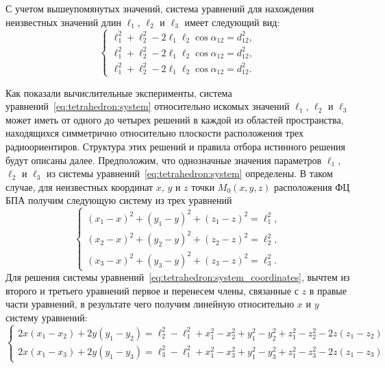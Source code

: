 \documentclass[../main.tex]{subfiles}
\begin{document}
С учетом вышеупомянутых значений, система уравнений для нахождения неизвестных значений длин $\ell_1$, $\ell_2$ и $\ell_3$ имеет следующий вид:
\begin{equation} \label{eq:tetrahedron:system}
    \begin{cases}
    \ell_1^2 + \ell_2^2 - 2 \ell_1 \ell_2 \cos\alpha_{12} = d_{12}^2, \\
    \ell_1^2 + \ell_2^2 - 2 \ell_1 \ell_2 \cos\alpha_{12} = d_{12}^2, \\
    \ell_1^2 + \ell_2^2 - 2 \ell_1 \ell_2 \cos\alpha_{12} = d_{12}^2.
    \end{cases}
\end{equation}

Как показали вычислительные эксперименты, система уравнений~\eqref{eq:tetrahedron:system} относительно искомых значений $\ell_1$, $\ell_2$ и $\ell_3$ может иметь от одного до четырех решений в каждой из областей пространства, находящихся симметрично относительно плоскости расположения трех радиоориентиров. Структура этих решений и правила отбора истинного решения будут описаны далее. Предположим, что однозначные значения параметров $\ell_1$, $\ell_2$ и $\ell_3$ из системы уравнений~\eqref{eq:tetrahedron:system} определены. В таком случае, для неизвестных координат $x$, $y$ и $z$ точки $M_0\left(x, y, z\right)$ расположения ФЦ БПА получим следующую систему из трех уравнений
\begin{equation}\label{eq:tetrahedron:system_coordinates}
    \begin{cases}
        \left(x_1 - x\right)^2 + \left(y_1 - y\right)^2 + \left(z_1 - z\right)^2 = \ell_1^2, \\
        \left(x_2 - x\right)^2 + \left(y_2 - y\right)^2 + \left(z_2 - z\right)^2 = \ell_2^2, \\
        \left(x_3 - x\right)^2 + \left(y_3 - y\right)^2 + \left(z_3 - z\right)^2 = \ell_3^2.
    \end{cases}
\end{equation}
Для решения системы уравнений~\eqref{eq:tetrahedron:system_coordinates}, вычтем из второго и третьего уравнений первое и перенесем члены, связанные с $z$ в правые части уравнений, в результате чего получим линейную относительно $x$ и $y$ систему уравнений:
\begin{equation} \label{eq:tetrahedron:system_linear}
    \begin{cases}
        2x \left(x_1 - x_2\right) + 2 y \left(y_1 - y_2\right) =\ell_2^2 - \ell_1^2 + x_1^2 - x_2^2 + y_1^2 - y_2^2 + z_1^2 - z_2^2 - 2z\left(z_1 - z_2\right) \\
        2x \left(x_1 - x_3\right) + 2 y \left(y_1 - y_3\right) =\ell_3^2 - \ell_1^2 + x_1^2 - x_3^2 + y_1^2 - y_3^2 + z_1^2 - z_3^2 - 2z\left(z_1 - z_3\right)
    \end{cases}
\end{equation}
\end{document}
